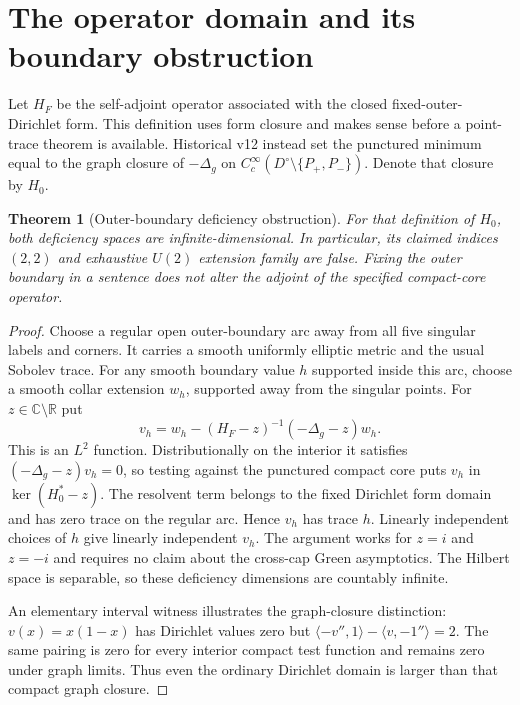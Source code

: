 \documentclass[11pt]{article}
\theoremstyle{readable}
\newtheorem{theorem}{Theorem}[section]
\theoremstyle{remark}\newtheorem{remark}[theorem]{Remark}
\newcommand{\R}{\mathbb R}\newcommand{\C}{\mathbb C}\newcommand{\Z}{\mathbb Z}
\begin{document}
\section{The operator domain and its boundary obstruction}\label{sec:green}
Let $H_F$ be the self-adjoint operator associated with the closed fixed-outer-
Dirichlet form. This definition uses form closure and makes sense before a
point-trace theorem is available. Historical v12 instead set the punctured
minimum equal to the graph closure of $-\Delta_g$ on
$C_c^\infty(D^\circ\setminus\{P_+,P_-\})$. Denote that closure by $H_0$.
\begin{theorem}[Outer-boundary deficiency obstruction]\label{thm:outer}
For that definition of $H_0$, both deficiency spaces are infinite-dimensional.
In particular, its claimed indices $(2,2)$ and exhaustive $U(2)$ extension
family are false. Fixing the outer boundary in a sentence does not alter
the adjoint of the specified compact-core operator.
\end{theorem}
\begin{proof}
Choose a regular open outer-boundary arc away from all five singular labels
and corners. It carries a smooth uniformly elliptic metric and the usual
Sobolev trace. For any smooth boundary value $h$ supported inside this arc,
choose a smooth collar extension $w_h$, supported away from the singular
points. For $z\in\C\setminus\R$ put
\[
 v_h=w_h-(H_F-z)^{-1}(-\Delta_g-z)w_h.
\]
This is an $L^2$ function. Distributionally on the interior it satisfies
$(-\Delta_g-z)v_h=0$, so testing against the punctured compact core puts
$v_h$ in $\ker(H_0^*-z)$. The resolvent term belongs to the fixed Dirichlet
form domain and has zero trace on the regular arc. Hence $v_h$ has trace
$h$. Linearly independent choices of $h$ give linearly independent $v_h$.
The argument works for $z=i$ and $z=-i$ and requires no claim about the
cross-cap Green asymptotics. The Hilbert space is separable, so these
deficiency dimensions are countably infinite.

An elementary interval witness illustrates the graph-closure distinction:
$v(x)=x(1-x)$ has Dirichlet values zero but
$\langle-v'',1\rangle-\langle v,-1''\rangle=2$. The same pairing is zero
for every interior compact test function and remains zero under graph
limits. Thus even the ordinary Dirichlet domain is larger than that compact
graph closure.
\end{proof}
\end{document}
